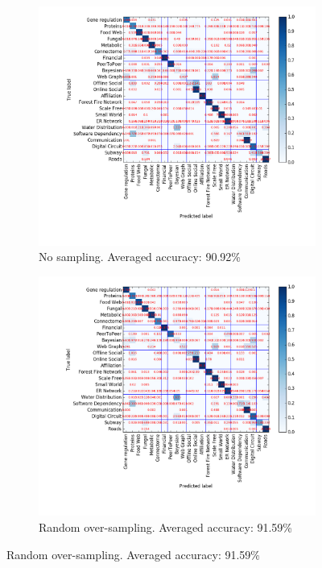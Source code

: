 \documentclass{article}
\begin{document}
\begin{figure}[H]
	\begin{subfigure}{0.48\textwidth}
	\includegraphics[width=\linewidth]{figs/similarity/SubDomain/None/confusion.png}
	\caption{No sampling. Averaged accuracy: 90.92\%} \label{no_confusion_sub}
	\end{subfigure}\hspace*{\fill}
	\begin{subfigure}{0.48\textwidth}
	\includegraphics[width=\linewidth]{figs/similarity/SubDomain/RandomOver/confusion.png}
	\caption{Random over-sampling. Averaged accuracy: 91.59\%} \label{random_over_confusion_sub}
	\end{subfigure}
	

\end{figure}
\end{document}
